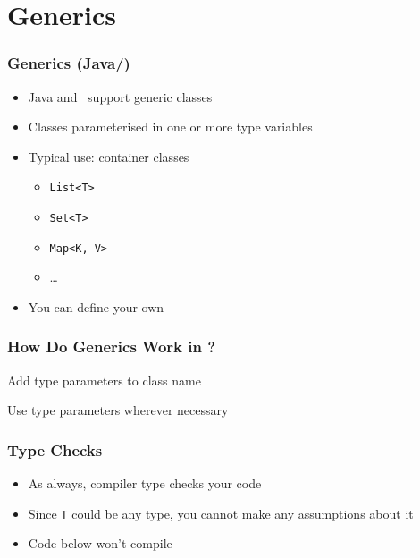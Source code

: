 \section{Generics}

\frame{\tableofcontents[currentsection]}

\begin{frame}
  \frametitle{Generics (Java/\csharp)}
  \begin{itemize}
    \item Java and \csharp\ support generic classes
    \item Classes parameterised in one or more type variables
    \item Typical use: container classes
          \begin{itemize}
            \item \texttt{List<T>}
            \item \texttt{Set<T>}
            \item \texttt{Map<K, V>}
            \item \dots
          \end{itemize}
    \item You can define your own
  \end{itemize}
\end{frame}

\begin{frame}
  \frametitle{How Do Generics Work in \csharp?}
  \vskip-10mm
  \begin{overprint}
    \begin{center}
      Add type parameters to class name
    \end{center}

    \begin{center}
      Use type parameters wherever necessary
    \end{center}
  \end{overprint}
\end{frame}

\begin{frame}
  \frametitle{Type Checks}
  \begin{itemize}
    \item As always, compiler type checks your code
    \item Since \texttt{T} could be any type, you cannot make any assumptions about it
    \item Code below won't compile
  \end{itemize}
\end{frame}


